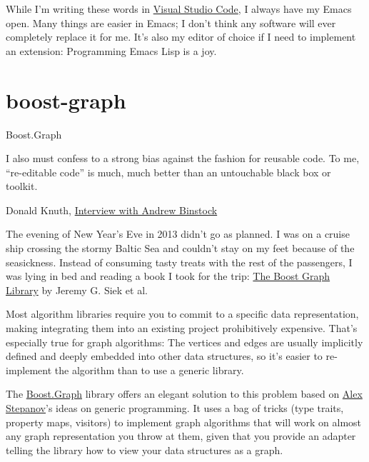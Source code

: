 \documentclass{article}
\begin{document}
While I'm writing these words in \href{https://code.visualstudio.com/}{Visual Studio Code}, I always have my Emacs open.
Many things are easier in Emacs; I don't think any software will ever completely replace it for me.
It's also my editor of choice if I need to implement an extension: Programming Emacs Lisp is a joy.

\section{boost-graph}{Boost.Graph}

\epigraph{
  I also must confess to a strong bias against the fashion for reusable code.
  To me, ``re-editable code'' is much, much better than an untouchable black box or toolkit.
}{
  Donald Knuth, \href{https://www.informit.com/articles/article.aspx?p=1193856}{Interview with Andrew Binstock}
}

The evening of New Year's Eve in 2013 didn't go as planned.
I was on a cruise ship crossing the stormy Baltic Sea and couldn't stay on my feet because of the seasickness.
Instead of consuming tasty treats with the rest of the passengers, I was lying in bed and reading a book I took for the trip: \href{https://www.goodreads.com/book/show/1705806.The_Boost_Graph_Library}{The Boost Graph Library} by Jeremy G. Siek et al.

Most algorithm libraries require you to commit to a specific data representation, making integrating them into an existing project prohibitively expensive.
That's especially true for graph algorithms: The vertices and edges are usually implicitly defined and deeply embedded into other data structures, so it's easier to re-implement the algorithm than to use a generic library.

The \href{https://www.boost.io/libraries/graph/}{Boost.Graph} library offers an elegant solution to this problem based on \href{https://en.wikipedia.org/wiki/Alexander_Stepanov}{Alex Stepanov}'s ideas on generic programming.
It uses a bag of tricks (type traits, property maps, visitors) to implement graph algorithms that will work on almost any graph representation you throw at them, given that you provide an adapter telling the library how to view your data structures as a graph.
\end{document}
